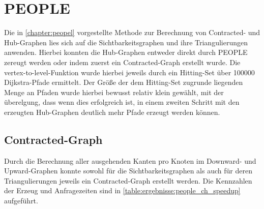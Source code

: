 
\section{PEOPLE}

Die in \autoref{chapter:peopel} vorgestellte Methode zur Berechnung von Contracted- und Hub-Graphen lies sich auf die Sichtbarkeitsgraphen und ihre Triangulierungen anwenden.
Hierbei konnten die Hub-Graphen entweder direkt durch PEOPLE zereugt werden oder indem zuerst ein Contracted-Graph erstellt wurde.
Die vertex-to-level-Funktion wurde hierbei jeweils durch ein Hitting-Set über \num{100000} Dijkstra-Pfade ermittelt.
Der Größe der dem Hitting-Set zugrunde liegenden Menge an Pfaden wurde hierbei bewusst relativ klein gewählt, mit der überelgung, dass wenn dies erfolgreich ist, in einem zweiten Schritt mit den erzeugten Hub-Graphen deutlich mehr Pfade erzeugt werden können.

\subsection{Contracted-Graph}

Durch die Berechnung aller ausgehenden Kanten pro Knoten im Downward- und Upward-Graphen konnte sowohl für die Sichtbarkeitsgraphen als auch für deren Triangulierungen jeweils ein Contracted-Graph erstellt werden.
Die Kennzahlen der Erzeug und Anfragezeiten sind in \autoref{table:ergebnisse:people_ch_speedup} aufgeführt.

